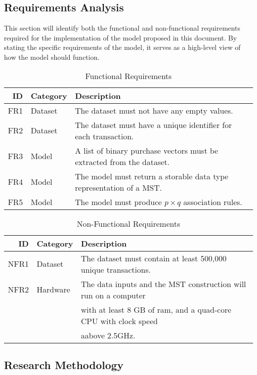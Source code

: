 \documentclass[a4paper,11pt]{article}
\begin{document}
\subsection{Requirements Analysis}
This section will identify both the functional and non-functional requirements required for the implementation of the model proposed in this document. By stating the specific requirements of the model,  it serves as a high-level view of how the model should function. 
 
\begin{table}[H]
\centering
\caption{Functional Requirements}
\begin{tabular}{@{}rll@{}}
\toprule
\textbf{ID} & \textbf{Category} & \textbf{Description}                   \\ \midrule
FR1        & Dataset           & The dataset must not have any empty values. \\
FR2        & Dataset           & The dataset must have a unique identifier for each transaction.\\ 
FR3     &  Model       & A list of binary purchase vectors must be extracted from the dataset.\\
FR4     &  Model       & The model must return a storable data type representation of a MST.\\
FR5    & Model        & The model must produce  $p \times q$ association rules.\\
\bottomrule
\end{tabular}
\label{tab:fr}
\end{table}

\begin{table}[H]
\centering
\caption{Non-Functional Requirements}
\begin{tabular}{@{}rll@{}}
\toprule
\textbf{ID} & \textbf{Category} & \textbf{Description}                   \\ \midrule
NFR1       & Dataset         & The dataset must contain at least 500,000 unique transactions.\\
NFR2     & Hardware    & The data inputs and the MST construction will run on a computer\\&&with at least 8 GB of ram, and a quad-core CPU with clock speed\\&&aabove 2.5GHz.\\
\bottomrule
\end{tabular}
\label{nfr}
\end{table}

\subsection{Research Methodology}
\end{document}
